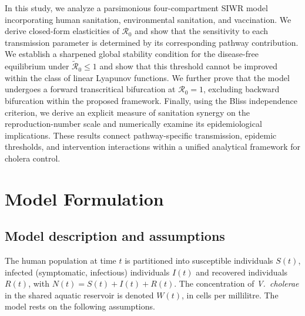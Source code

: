 \documentclass[11pt]{article}
\theoremstyle{plain}
\theoremstyle{definition}
\theoremstyle{remark}
\newcommand{\Rz}{\mathcal{R}_0}
\newcommand{\Rtil}{\widetilde{\mathcal{R}}_0}
\begin{document}
In this study, we analyze a parsimonious four-compartment SIWR model incorporating human sanitation, environmental sanitation, and vaccination. We derive closed-form elasticities of $\Rz$ and show that the sensitivity to each transmission parameter is determined by its corresponding pathway contribution. We establish a sharpened global stability condition for the disease-free equilibrium under $\Rtil\le1$ and show that this threshold cannot be improved within the class of linear Lyapunov functions. We further prove that the model undergoes a forward transcritical bifurcation at $\Rz=1$, excluding backward bifurcation within the proposed framework. Finally, using the Bliss independence criterion, we derive an explicit measure of sanitation synergy on the reproduction-number scale and numerically examine its epidemiological implications. These results connect pathway-specific transmission, epidemic thresholds, and intervention interactions within a unified analytical framework for cholera control.

\section{Model Formulation}\label{sec2}

\subsection{Model description and assumptions}\label{subsec:model_desc}

The human population at time $t$ is partitioned into susceptible individuals $S(t)$, infected (symptomatic, infectious) individuals $I(t)$ and recovered individuals $R(t)$, with $N(t)=S(t)+I(t)+R(t)$. The concentration of \textit{V.\ cholerae} in the shared aquatic reservoir is denoted $W(t)$, in cells per millilitre. The model rests on the following assumptions.
\end{document}
